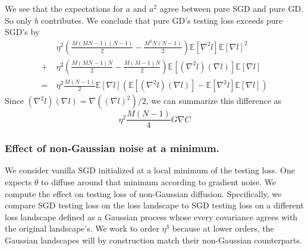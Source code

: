 \documentclass[anon,12pt]{colt2021} %
\newcommand{\wrap}[1]{\left(#1\right)}
\newcommand{\expct}[1]{\mathbb{E}\left[#1\right]}
\begin{document}
\begin{shaded}
                We see that the expectations for $a$ and $a^2$ agree
                between pure SGD and pure GD.  So only $b$ contributes.  We
                conclude that pure GD's testing loss exceeds pure SGD's by
                \begin{align*}
                       ~&\eta^2
                        \wrap{\frac{M(MN-1)(N-1)}{2}  - \frac{M^2N(N-1)}{2}}
                        \expct{\nabla^2 l} \expct{\nabla l}^2 \\
                    +   ~&\eta^2 
                        \wrap{\frac{M(MN-1)N}{2} - \frac{M(M-1)N}{2}}
                        \expct{(\nabla^2 l) (\nabla l)} \expct{\nabla l} \\
                    = 
                        ~&\eta^2     \frac{M(N-1)}{2}
                    \expct{\nabla l} \wrap{
                          \expct{(\nabla^2 l) (\nabla l)}
                        - \expct{\nabla^2 l} \expct{\nabla l}
                    }
                \end{align*}
                Since $(\nabla^2 l) (\nabla l) = \nabla((\nabla l)^2)/2$, we can 
                summarize this difference as
                $$
                    \eta^2 \frac{M(N-1)}{4}
                    G \nabla C 
                $$
            \end{shaded}

        \subsubsection{Effect of non-Gaussian noise at a minimum.}
            We consider vanilla SGD initialized at a local minimum of the testing loss.
            One expects $\theta$ to diffuse around that minimum according to
            gradient noise.  We compute the effect on testing loss of non-Gaussian
            diffusion.  Specifically, we compare SGD testing loss on the loss
            landscape to SGD testing loss on a different loss landscape defined as a
            Gaussian process whose every covariance agrees with the original
            landscape's.  We work to order $\eta^3$ because at lower orders,
            the Gaussian landscapes will by construction match their non-Gaussian
            counterparts.
\end{document}
